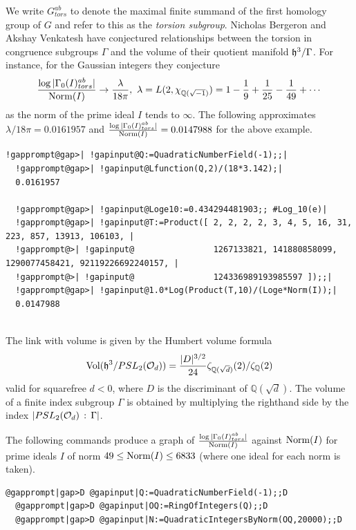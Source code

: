 \documentclass[a4paper,11pt]{report}
\begin{document}
{{We write $G^{ab}_{tors}$ to denote the maximal finite summand of the first homology group of $G$ and refer to this as the \emph{torsion subgroup}. Nicholas Bergeron and Akshay Venkatesh \cite{bergeron} have conjectured relationships between the torsion in congruence subgroups $\Gamma$ and the volume of their quotient manifold ${\frak h}^3/\Gamma$. For instance, for the Gaussian integers they conjecture 
\[ \frac{\log |\Gamma_0(I)_{tors}^{ab}|}{{\rm Norm}(I)} \rightarrow
\frac{\lambda}{18\pi},\ \lambda =L(2,\chi_{\mathbb Q(\sqrt{-1})}) = 1
-\frac{1}{9} + \frac{1}{25} - \frac{1}{49} + \cdots\]
 as the norm of the prime ideal $I$ tends to $\infty$. The following approximates $\lambda/18\pi = 0.0161957$ and $\frac{\log |\Gamma_0(I)_{tors}^{ab}|}{{\rm Norm}(I)} = 0.0147988$ for the above example. 
\begin{Verbatim}[commandchars=!@|,fontsize=\small,frame=single,label=Example]
  !gapprompt@gap>| !gapinput@Q:=QuadraticNumberField(-1);;|
  !gapprompt@gap>| !gapinput@Lfunction(Q,2)/(18*3.142);|
  0.0161957
  
  !gapprompt@gap>| !gapinput@Loge10:=0.434294481903;; #Log_10(e)|
  !gapprompt@gap>| !gapinput@T:=Product([ 2, 2, 2, 2, 3, 4, 5, 16, 31, 223, 857, 13913, 106103, |
  !gapprompt@>| !gapinput@                1267133821, 141880858099, 1290077458421, 92119226692240157, |
  !gapprompt@>| !gapinput@                124336989193985597 ]);;|
  !gapprompt@gap>| !gapinput@1.0*Log(Product(T,10)/(Loge*Norm(I));|
  0.0147988
  
\end{Verbatim}
 

 The link with volume is given by the Humbert volume formula 
\[ {\rm Vol} ( {\frak h}^3 / PSL_2( {\cal O}_{d} ) ) = \frac{|D|^{3/2}}{24}
\zeta_{ \mathbb Q( \sqrt{d} ) }(2)/\zeta_{\mathbb Q}(2) \]
 valid for square\texttt{}free $d<0$, where $D$ is the discriminant of $\mathbb Q(\sqrt{d})$. The volume of a finite index subgroup $\Gamma$ is obtained by multiplying the right\texttt{}hand side by the index $|PSL_2({\cal O}_d)\,:\, \Gamma|$. 

 The following commands produce a graph of $ \frac{\log |\Gamma_0(I)_{tors}^{ab}|}{{\rm Norm}(I)}$ against ${\rm Norm}(I)$ for prime ideals $I$ of norm $49 \le {\rm Norm}(I) \le 6833$ (where one ideal for each norm is taken). 
\begin{Verbatim}[commandchars=@|D,fontsize=\small,frame=single,label=Example]
  @gapprompt|gap>D @gapinput|Q:=QuadraticNumberField(-1);;D
  @gapprompt|gap>D @gapinput|OQ:=RingOfIntegers(Q);;D
  @gapprompt|gap>D @gapinput|N:=QuadraticIntegersByNorm(OQ,20000);;D
  

\end{Verbatim}}}
\end{document}
